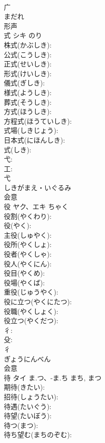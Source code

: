 \documentclass[8pt]{extreport}
\begin{document}
\begin{CJK}{UTF8}{min}
\\	广	
\\	まだれ	
\\	形声 
\\	式	シキ		のり	
\\	株式(かぶしき): 
\\	公式(こうしき): 
\\	正式(せいしき): 
\\	形式(けいしき): 
\\	儀式(ぎしき): 
\\	様式(ようしき): 
\\	葬式(そうしき): 
\\	方式(ほうしき): 
\\	方程式(ほうていしき): 
\\	式場(しきじょう): 
\\	日本式(にほんしき): 
\\	式(しき): 
\\	弋: 
\\	工: 
\\	弋	
\\	しきがまえ・いぐるみ	
\\	会意 
\\	役	ヤク、エキ		ちゃく	
\\	役割(やくわり): 
\\	役(やく): 
\\	主役(しゅやく): 
\\	役所(やくしょ): 
\\	役者(やくしゃ): 
\\	役人(やくにん): 
\\	役目(やくめ): 
\\	役場(やくば): 
\\	重役(じゅうやく): 
\\	役に立つ(やくにたつ): 
\\	役職(やくしょく): 
\\	役立つ(やくだつ): 
\\	彳: 
\\	殳: 
\\	彳	
\\	ぎょうにんべん	
\\	会意 
\\	待	タイ	ま.つ、-ま.ち	まち, まつ	
\\	期待(きたい): 
\\	招待(しょうたい): 
\\	待遇(たいぐう): 
\\	待望(たいぼう): 
\\	待つ(まつ): 
\\	待ち望む(まちのぞむ): 

\end{CJK}
\end{document}
